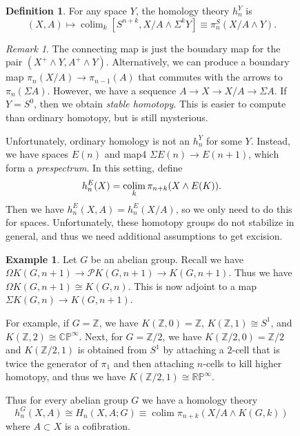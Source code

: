 \documentclass[leqno, openany]{memoir}
\theoremstyle{definition}
\newtheorem{defn}[thm]{Definition}
\newtheorem{exm}[thm]{Example}
\theoremstyle{remark}
\newtheorem{rmk}[thm]{Remark}
\theoremstyle{plain}
\theoremstyle{definition}
\theoremstyle{remark}
\newcommand{\R}{\mathbb{R}}
\newcommand{\C}{\mathbb{C}}
\newcommand{\Z}{\mathbb{Z}}
\renewcommand{\P}{\mathbb{P}}
\newcommand{\mc}[1]{\mathcal{#1}}
\begin{document}
\begin{figure}[H]
\begin{defn} For any space $Y$, the homology theory $h_n^Y$ is \[ (X,A) \mapsto
\operatorname{colim}_k [S^{n+k}, X/A \wedge \Sigma^k Y] \equiv \pi_n^S(X/A
\wedge Y). \] \end{defn}


\begin{rmk} The connecting map is just the boundary map for the pair $(X^+
    \wedge Y, A^+ \wedge Y)$. Alternatively, we can produce a boundary map
    $\pi_n(X/A) \to \pi_{n-1}(A)$ that commutes with the arrows to
    $\pi_n(\Sigma A)$. However, we have a sequence $A \to X \to X/A \to \Sigma
    A$. If $Y = S^0$, then we obtain \textit{stable homotopy}. This is easier
    to compute than ordinary homotopy, but is still mysterious.  \end{rmk}

Unfortunately, ordinary homology is not an $h_n^Y$ for some $Y$. Instead, we
have spaces $E(n)$ and map4 $\Sigma E(n) \to E(n+1)$, which form a
\textit{prespectrum}. In this setting, define \[ h_n^E(X) =
\operatornamewithlimits{colim}_k \pi_{n+k}(X \wedge E(K)). \] Then we have
$h_n^E(X,A) = h_n^E(X/A)$, so we only need to do this for spaces.
Unfortunately, these homotopy groups do not stabilize in general, and thus we
need additional assumptions to get excision.

\begin{exm} Let $G$ be an abelian group. Recall we have $\Omega K(G, n+1) \to
    \mc{P} K(G, n+1) \to K(G, n+1)$. Thus we have $\Omega K(G, n+1) \cong K(G,
    n)$. This is now adjoint to a map $\Sigma K(G, n) \to K(G, n+1)$. 

    For example, if $G = \Z$, we have $K(\Z, 0) = \Z$, $K(\Z, 1) \cong S^1$,
    and $K(\Z, 2) \cong \C\P^{\infty}$. Next, for $G = \Z/2$, we have $K(\Z/2,
    0) = \Z/2$ and $K(\Z/2, 1)$ is obtained from $S^1$ by attaching a $2$-cell
    that is twice the generator of $\pi_1$ and then attaching $n$-cells to kill
    higher homotopy, and thus we have $K(\Z/2, 1) \cong \R\P^{\infty}$. 

    Thus for every abelian group $G$ we have a homology theory \[ h_n^G(X, A)
    \cong H_n(X,A;G) \equiv \operatorname{colim} \pi_{n+k}(X/A \wedge K(G, k))
\] where $A \subset X$ is a cofibration.  \end{exm}


\end{figure}
\end{document}
